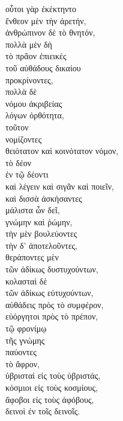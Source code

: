 

{\large
\begin{greek}
\noindent οὗτοι γὰρ ἐκέκτηντο \\
ἔνθεον μὲν τὴν ἀρετήν, \\
ἀνθρώπινον δὲ τὸ θνητόν, \\
πολλὰ μὲν δὴ \\
\tabto{2em} τὸ πρᾶον ἐπιεικὲς \\
\tabto{2em} τοῦ αὐθάδους δικαίου \\
\tabto{4em} προκρίνοντες, \\
πολλὰ δὲ \\
\tabto{2em} νόμου ἀκριβείας \\
\tabto{2em} λόγων ὀρθότητα, \\
τοῦτον\\
\tabto{2em} νομίζοντες \\
θειότατον καὶ κοινότατον νόμον, \\
\tabto{4em} τὸ δέον \\
\tabto{4em} ἐν τῷ δέοντι \\
\tabto{4em} καὶ λέγειν καὶ σιγᾶν καὶ ποιεῖν, \\
καὶ δισσὰ ἀσκήσαντες \\
\tabto{2em} μάλιστα ὧν δεῖ, \\
\tabto{4em} γνώμην καὶ ῥώμην, \\
\tabto{6em} τὴν μὲν βουλεύοντες \\
\tabto{6em} τὴν δ' ἀποτελοῦντες, \\
θεράποντες μὲν \\
\tabto{2em} τῶν ἀδίκως δυστυχούντων, \\
κολασταὶ δὲ \\
\tabto{2em} τῶν ἀδίκως εὐτυχούντων, \\
αὐθάδεις πρὸς τὸ συμφέρον, \\
εὐόργητοι πρὸς τὸ πρέπον, \\
\tabto{2em} τῷ φρονίμῳ \\
\tabto{4em} τῆς γνώμης \\
παύοντες \\
\tabto{2em} τὸ ἄφρον, \\
ὑβρισταὶ εἰς τοὺς ὑβριστάς, \\
κόσμιοι εἰς τοὺς κοσμίους, \\
ἄφοβοι εἰς τοὺς ἀφόβους, \\
δεινοὶ ἐν τοῖς δεινοῖς. \\

\end{greek}
}

